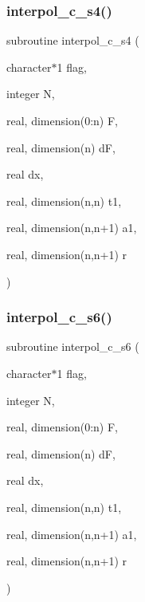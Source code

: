 \subsubsection{\texorpdfstring{interpol\+\_\+c\+\_\+s4()}{interpol\_c\_s4()}}
{\footnotesize\ttfamily subroutine interpol\+\_\+c\+\_\+s4 (\begin{DoxyParamCaption}\item[{character$\ast$1}]{flag,  }\item[{integer}]{N,  }\item[{real, dimension(0\+:n)}]{F,  }\item[{real, dimension(n)}]{dF,  }\item[{real}]{dx,  }\item[{real, dimension(n,n)}]{t1,  }\item[{real, dimension(n,n+1)}]{a1,  }\item[{real, dimension(n,n+1)}]{r }\end{DoxyParamCaption})}

\mbox{\label{ders__n_8f_af0bd629e206c5e562d08607f3c475144}} 
\subsubsection{\texorpdfstring{interpol\+\_\+c\+\_\+s6()}{interpol\_c\_s6()}}
{\footnotesize\ttfamily subroutine interpol\+\_\+c\+\_\+s6 (\begin{DoxyParamCaption}\item[{character$\ast$1}]{flag,  }\item[{integer}]{N,  }\item[{real, dimension(0\+:n)}]{F,  }\item[{real, dimension(n)}]{dF,  }\item[{real}]{dx,  }\item[{real, dimension(n,n)}]{t1,  }\item[{real, dimension(n,n+1)}]{a1,  }\item[{real, dimension(n,n+1)}]{r }\end{DoxyParamCaption})}

\mbox{\label{ders__n_8f_abd7d46404e91bd0fc87d72b6b90a7122}} 
